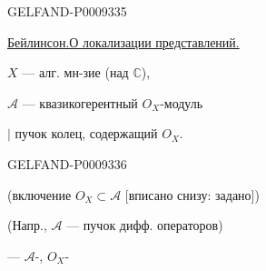 \begin{GelfandAdjacentEvidence}{GELFAND-P000933}{5}


\underline{\underline{Бейлинсон.}}\qquad\underline{О локализации представлений.}

$X$ --- алг. мн-зие (над $\mathbb C$),

$\mathcal A$ --- квазикогерентный $O_X$-модуль

\hspace{2em}\(\vert\) пучок колец, содержащий $O_X$.
\end{GelfandAdjacentEvidence}
\begin{GelfandAdjacentEvidence}{GELFAND-P000933}{6}


(включение $O_X\subset\mathcal A$ [вписано снизу: задано])
\end{GelfandAdjacentEvidence}


(Напр., $\mathcal A$ --- пучок дифф. операторов)

 ---  $\mathcal A$-,
 $O_X$-

